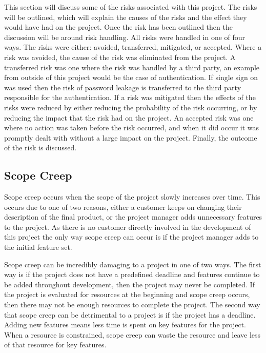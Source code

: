 \documentclass{article}
\begin{document}
This section will discuss some of the risks associated with this project. The risks will be outlined, which will explain the causes of the risks and the effect they would have had on the project. Once the risk has been outlined then the discussion will be around risk handling. All risks were handled in one of four ways. The risks were either: avoided, transferred, mitigated, or accepted. Where a risk was avoided, the cause of the risk was eliminated from the project. A transferred risk was one where the risk was handled by a third party, an example from outside of this project would be the case of authentication. If single sign on was used then the risk of password leakage is transferred to the third party responsible for the authentication. If a risk was mitigated then the effects of the risks were reduced by either reducing the probability of the risk occurring, or by reducing the impact that the risk had on the project. An accepted risk was one where no action was taken before the risk occurred, and when it did occur it was promptly dealt with without a large impact on the project. Finally, the outcome of the risk is discussed. \par

\subsection{Scope Creep}

Scope creep occurs when the scope of the project slowly increases over time. This occurs due to one of two reasons, either a customer keeps on changing their description of the final product, or the project manager adds unnecessary features to the project. As there is no customer directly involved in the development of this project the only way scope creep can occur is if the project manager adds to the initial feature set. \par

Scope creep can be incredibly damaging to a project in one of two ways. The first way is if the project does not have a predefined deadline and features continue to be added throughout development, then the project may never be completed. If the project is evaluated for resources at the beginning and scope creep occurs, then there may not be enough resources to complete the project. The second way that scope creep can be detrimental to a project is if the project has a deadline. Adding new features means less time is spent on key features for the project. When a resource is constrained, scope creep can waste the resource and leave less of that resource for key features. \par
\end{document}
